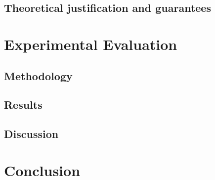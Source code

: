 \documentclass[a4paper,12pt]{article}
\begin{document}
\subsection{Theoretical justification and guarantees}

\section{Experimental Evaluation}
\subsection{Methodology}

\subsection{Results}

\subsection{Discussion}


\section{Conclusion}
\end{document}
